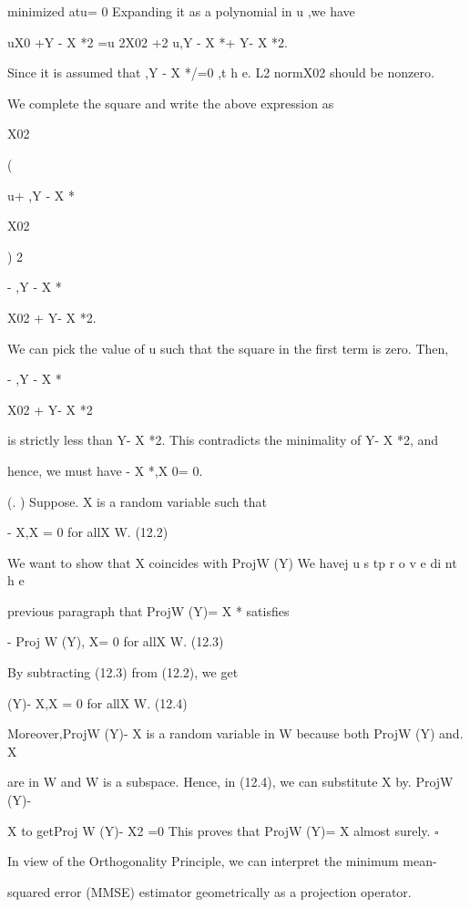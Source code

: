 minimized atu= 0 Expanding it as a polynomial in u ,we have

uX0 +Y - X *2 =u 2X02 +2 u,Y - X *\rangle+ Y- X *2.

Since it is assumed that ,Y - X *\rangle /=0 ,t h e. L2 normX02 should be nonzero.

We complete the square and write the above expression as

X02

(

u+ ,Y - X *\rangle

X02

) 2

- ,Y - X *

X02 + Y- X *2.

We can pick the value of u such that the square in the first term is zero. Then,

- ,Y - X *

X02 + Y- X *2

is strictly less than Y- X *2. This contradicts the minimality of Y- X *2, and

hence, we must have \langleY- X *,X 0\rangle= 0.

(. ) Suppose. X is a random variable such that

\langleY- X,X \rangle= 0 for allX \in W. (12.2)

We want to show that X coincides with ProjW (Y) We havej u s tp r o v e di nt h e

previous paragraph that ProjW (Y)= X * satisfies

\langleY- Proj W (Y), X\rangle= 0 for allX \in W. (12.3)

By subtracting (12.3) from (12.2), we get

\langleProjW (Y)- X,X \rangle= 0 for allX \in W. (12.4)

Moreover,ProjW (Y)- X is a random variable in W because both ProjW (Y) and. X

are in W and W is a subspace. Hence, in (12.4), we can substitute X by. ProjW (Y)-

X to getProj W (Y)- X2 =0 This proves that ProjW (Y)= X almost surely. \hfill $\square$

In view of the Orthogonality Principle, we can interpret the minimum mean-

squared error (MMSE) estimator geometrically as a projection operator.
